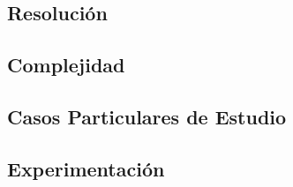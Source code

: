 \subsection{Resoluci\'on}
    

\subsection{Complejidad}
    

\subsection{Casos Particulares de Estudio}
    

\subsection{Experimentaci\'on}
    
